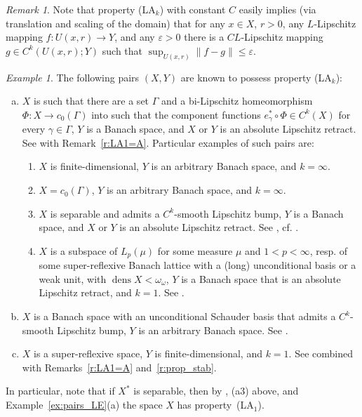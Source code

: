 \documentclass[a4paper,twoside,10pt,reqno,draft]{amsart}
\let\comp=\circ
\theoremstyle{definition}
\theoremstyle{remark}
\newtheorem{remark}[theorem]{Remark}
\newtheorem{example}[theorem]{Example}
\newcommand\norm[1]{\mathopen\|#1\mathclose\|}
\newcommand\ga{\gamma}
\newcommand\Ga{\Gamma}
\newcommand\ve{\varepsilon}
\newcommand\om{\omega}
\DeclareMathOperator{\dens}{dens}
\newcommand\pLA[1]{(LA$_#1$)}
\begin{document}
\begin{remark}\label{r:LA-any_ball}
Note that property \pLA k with constant $C$ easily implies (via translation and scaling of the domain) that
for any $x\in X$, $r>0$, any $L$-Lipschitz mapping $f\colon U(x,r)\to Y$, and any $\ve>0$ there is a $CL$-Lipschitz mapping $g\in C^k(U(x,r);Y)$ such that $\sup_{U(x,r)}\norm{f-g}\le\ve$.
\end{remark}

\begin{example}\label{ex:pairs_LA}
The following pairs $(X,Y)$ are known to possess property \pLA k:
\begin{enumerate}[(a)]
\item
$X$ is such that there are a set $\Ga$ and a bi-Lipschitz homeomorphism $\Phi\colon X\to c_0(\Ga)$ into such that the component functions $e_\ga^*\comp\Phi\in C^k(X)$ for every $\ga\in\Ga$,
$Y$ is a Banach space, and $X$ or $Y$ is an absolute Lipschitz retract.
See \cite[Theorem~7.79]{HJ} with Remark~\ref{r:LA1=A}.
Particular examples of such pairs are:
\begin{enumerate}[({a}1)]
\item $X$ is finite-dimensional, $Y$ is an arbitrary Banach space, and $k=\infty$.
\item $X=c_0(\Ga)$, $Y$ is an arbitrary Banach space, and $k=\infty$.
\item $X$ is separable and admits a $C^k$-smooth Lipschitz bump, $Y$ is a Banach space, and $X$ or $Y$ is an absolute Lipschitz retract.
See \cite[Corollary~7.65]{HJ}, cf. \cite[Corollary~7.81]{HJ}.
\item
$X$ is a subspace of $L_p(\mu)$ for some measure $\mu$ and $1<p<\infty$, resp. of some super-reflexive Banach lattice with a (long) unconditional basis or a weak unit, with $\dens X<\om_\om$,
$Y$ is a Banach space that is an absolute Lipschitz retract, and $k=1$.
See \cite[Corollary~29]{HJS}.
\end{enumerate}
\item $X$ is a Banach space with an unconditional Schauder basis that admits a $C^k$-smooth Lipschitz bump, $Y$ is an arbitrary Banach space.
See \cite[Corollary~7.87]{HJ}.
\item
$X$ is a super-reflexive space, $Y$ is finite-dimensional, and $k=1$.
See \cite{J1} combined with Remarks~\ref{r:LA1=A} and~\ref{r:prop_stab}.
\end{enumerate}

In particular, note that if $X^*$ is separable, then by \cite[Theorem~II.3.1]{DGZ}, (a3) above, and Example~\ref{ex:pairs_LE}(a) the space $X$ has property~\pLA1.
\end{example}
\end{document}
